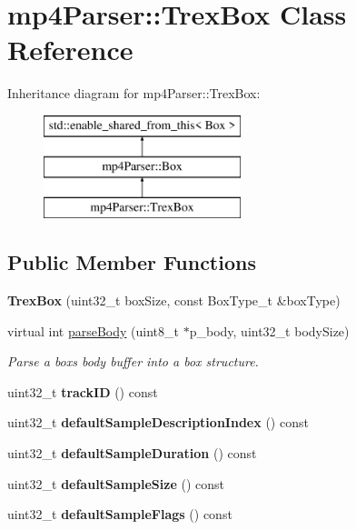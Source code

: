 \hypertarget{classmp4_parser_1_1_trex_box}{}\section{mp4\+Parser\+::Trex\+Box Class Reference}
\label{classmp4_parser_1_1_trex_box}
Inheritance diagram for mp4\+Parser\+::Trex\+Box\+:\begin{figure}[H]
\begin{center}
\leavevmode
\includegraphics[height=3.000000cm]{classmp4_parser_1_1_trex_box}
\end{center}
\end{figure}
\subsection*{Public Member Functions}
\begin{DoxyCompactItemize}
\item 
\mbox{\label{classmp4_parser_1_1_trex_box_a7c2f4461656ec66e54218b32c9248fb5}} 
{\bfseries Trex\+Box} (uint32\+\_\+t box\+Size, const Box\+Type\+\_\+t \&box\+Type)
\item 
virtual int \mbox{\hyperlink{classmp4_parser_1_1_trex_box_af4b5616abea11f60d63af8f9070fafdf}{parse\+Body}} (uint8\+\_\+t $\ast$p\+\_\+body, uint32\+\_\+t body\+Size)
\begin{DoxyCompactList}\small\item\em Parse a box\textquotesingle{}s body buffer into a box structure. \end{DoxyCompactList}\item 
\mbox{\label{classmp4_parser_1_1_trex_box_a05475517ee3ab660d87223ba0162423b}} 
uint32\+\_\+t {\bfseries track\+ID} () const
\item 
\mbox{\label{classmp4_parser_1_1_trex_box_a61f168e385118e114d9b9da88e801025}} 
uint32\+\_\+t {\bfseries default\+Sample\+Description\+Index} () const
\item 
\mbox{\label{classmp4_parser_1_1_trex_box_a80f92dc25c78b0eec8b1ea0bc53aab9f}} 
uint32\+\_\+t {\bfseries default\+Sample\+Duration} () const
\item 
\mbox{\label{classmp4_parser_1_1_trex_box_aea11c36fa0c4d77a616b2fd2fb6ce608}} 
uint32\+\_\+t {\bfseries default\+Sample\+Size} () const
\item 
\mbox{\label{classmp4_parser_1_1_trex_box_a524ad4a3e7412f1c9861fc3bde00ebb1}} 
uint32\+\_\+t {\bfseries default\+Sample\+Flags} () const
\end{DoxyCompactItemize}
